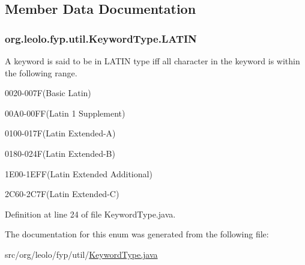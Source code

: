 \subsection{Member Data Documentation}
\hypertarget{enumorg_1_1leolo_1_1fyp_1_1util_1_1_keyword_type_a3d95aac3eb329bd4dbd98066c5c2bc68}{
\subsubsection[{L\-A\-T\-I\-N}]{\setlength{\rightskip}{0pt plus 5cm}org.\-leolo.\-fyp.\-util.\-Keyword\-Type.\-L\-A\-T\-I\-N}}\label{enumorg_1_1leolo_1_1fyp_1_1util_1_1_keyword_type_a3d95aac3eb329bd4dbd98066c5c2bc68}
A keyword is said to be in L\-A\-T\-I\-N type iff all character in the keyword is within the following range. 
\begin{DoxyItemize}
\item 0020-\/007\-F(Basic Latin) 
\item 00\-A0-\/00\-F\-F(Latin 1 Supplement) 
\item 0100-\/017\-F(Latin Extended-\/\-A) 
\item 0180-\/024\-F(Latin Extended-\/\-B) 
\item 1\-E00-\/1\-E\-F\-F(Latin Extended Additional) 
\item 2\-C60-\/2\-C7\-F(Latin Extended-\/\-C) 
\end{DoxyItemize}

Definition at line 24 of file Keyword\-Type.\-java.



The documentation for this enum was generated from the following file\-:\begin{DoxyCompactItemize}
\item 
src/org/leolo/fyp/util/\hyperlink{_keyword_type_8java}{Keyword\-Type.\-java}\end{DoxyCompactItemize}

